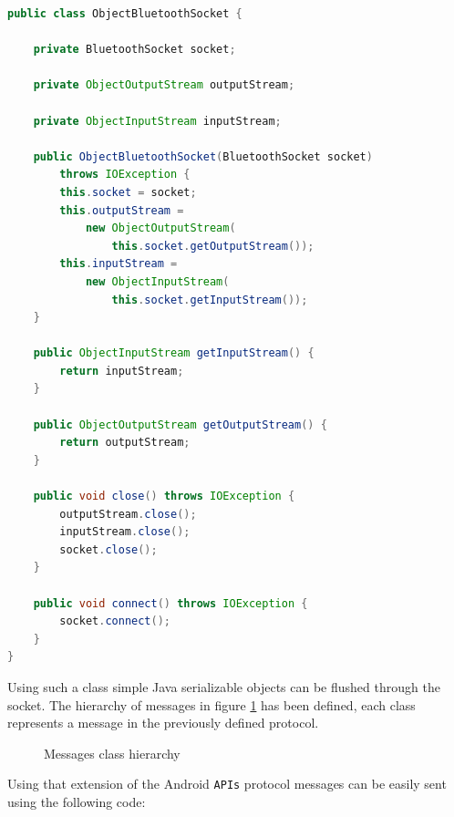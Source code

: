 \documentclass[conference]{IEEEtran}
\begin{document}
\begin{lstlisting}[language=Java, caption=ObjectBluetoothSocket class]
public class ObjectBluetoothSocket {
	
	private BluetoothSocket socket;
	
	private ObjectOutputStream outputStream;
	
	private ObjectInputStream inputStream;
	
	public ObjectBluetoothSocket(BluetoothSocket socket) 
		throws IOException {
		this.socket = socket;
		this.outputStream = 
			new ObjectOutputStream(
				this.socket.getOutputStream());
		this.inputStream = 
			new ObjectInputStream(
				this.socket.getInputStream());
	}
	
	public ObjectInputStream getInputStream() {
		return inputStream;
	}
	
	public ObjectOutputStream getOutputStream() {
		return outputStream;
	}
	
	public void close() throws IOException {
		outputStream.close();
		inputStream.close();
		socket.close();
	}
	
	public void connect() throws IOException {
		socket.connect();
	}
}
\end{lstlisting}
Using such a class simple Java serializable objects can be flushed through the socket. The hierarchy of messages in figure \ref{img:messages} has been defined, each class represents a message in the previously defined protocol.

\begin{figure}[!ht]
\begin{center}
\caption{Messages class hierarchy}
\label{img:messages}
\end{center}
\end{figure}

Using that extension of the Android \texttt{APIs} protocol messages can be easily sent using the following code:
\end{document}
